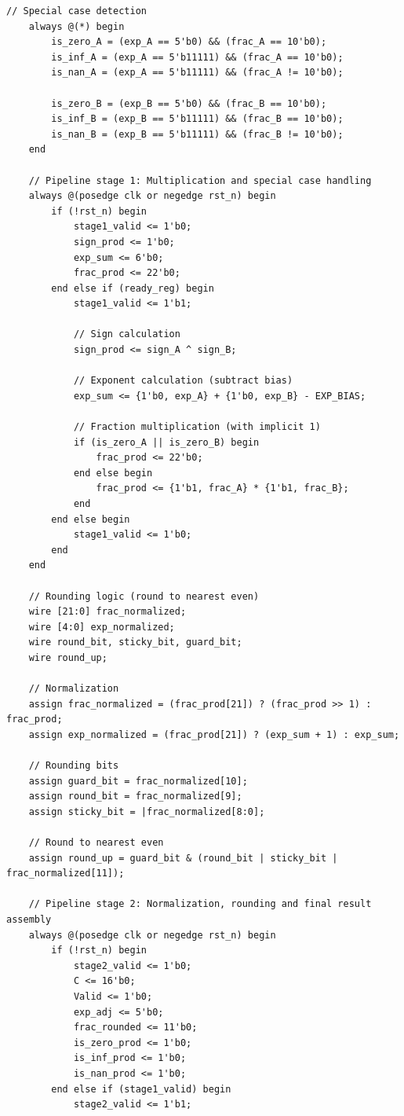 \documentclass[UTF8]{ctexart}
\begin{document}
\begin{lstlisting}[frame=shadowbox,caption=Demo\_RTL\_Complete.v]
    // Special case detection
    always @(*) begin
        is_zero_A = (exp_A == 5'b0) && (frac_A == 10'b0);
        is_inf_A = (exp_A == 5'b11111) && (frac_A == 10'b0);
        is_nan_A = (exp_A == 5'b11111) && (frac_A != 10'b0);
        
        is_zero_B = (exp_B == 5'b0) && (frac_B == 10'b0);
        is_inf_B = (exp_B == 5'b11111) && (frac_B == 10'b0);
        is_nan_B = (exp_B == 5'b11111) && (frac_B != 10'b0);
    end
    
    // Pipeline stage 1: Multiplication and special case handling
    always @(posedge clk or negedge rst_n) begin
        if (!rst_n) begin
            stage1_valid <= 1'b0;
            sign_prod <= 1'b0;
            exp_sum <= 6'b0;
            frac_prod <= 22'b0;
        end else if (ready_reg) begin
            stage1_valid <= 1'b1;
            
            // Sign calculation
            sign_prod <= sign_A ^ sign_B;
            
            // Exponent calculation (subtract bias)
            exp_sum <= {1'b0, exp_A} + {1'b0, exp_B} - EXP_BIAS;
            
            // Fraction multiplication (with implicit 1)
            if (is_zero_A || is_zero_B) begin
                frac_prod <= 22'b0;
            end else begin
                frac_prod <= {1'b1, frac_A} * {1'b1, frac_B};
            end
        end else begin
            stage1_valid <= 1'b0;
        end
    end
    
    // Rounding logic (round to nearest even)
    wire [21:0] frac_normalized;
    wire [4:0] exp_normalized;
    wire round_bit, sticky_bit, guard_bit;
    wire round_up;
    
    // Normalization
    assign frac_normalized = (frac_prod[21]) ? (frac_prod >> 1) : frac_prod;
    assign exp_normalized = (frac_prod[21]) ? (exp_sum + 1) : exp_sum;
    
    // Rounding bits
    assign guard_bit = frac_normalized[10];
    assign round_bit = frac_normalized[9];
    assign sticky_bit = |frac_normalized[8:0];
    
    // Round to nearest even
    assign round_up = guard_bit & (round_bit | sticky_bit | frac_normalized[11]);
    
    // Pipeline stage 2: Normalization, rounding and final result assembly
    always @(posedge clk or negedge rst_n) begin
        if (!rst_n) begin
            stage2_valid <= 1'b0;
            C <= 16'b0;
            Valid <= 1'b0;
            exp_adj <= 5'b0;
            frac_rounded <= 11'b0;
            is_zero_prod <= 1'b0;
            is_inf_prod <= 1'b0;
            is_nan_prod <= 1'b0;
        end else if (stage1_valid) begin
            stage2_valid <= 1'b1;
            

\end{lstlisting}
\end{document}
